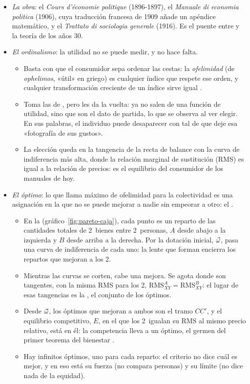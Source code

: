 \documentclass[11pt]{article}
\begin{document}
\begin{itemize}
\item \emph{La obra}: el \emph{Cours d'économie politique} (1896-1897)\nocite{Pareto1896Cours}, el \emph{Manuale di economia politica} (1906)\nocite{Pareto1906Manuale}, cuya traducción francesa de 1909 añade un apéndice matemático, y el \emph{Trattato di sociologia generale} (1916)\nocite{Pareto1916Trattato}. Es el puente entre  y la teoría de los años 30.
\item \emph{El ordinalismo}: la utilidad no se puede medir, y no hace falta.
  \begin{itemize}
  \item Basta con que el consumidor sepa ordenar las cestas: la \emph{ofelimidad} (de \emph{ophelimos}, «útil» en griego) es cualquier índice que respete ese orden, y cualquier transformación creciente de un índice sirve igual .
  \item Toma las  de , pero les da la vuelta: ya no salen de una función de utilidad, sino que son el dato de partida, lo que se observa al ver elegir. En sus palabras, el individuo puede desaparecer con tal de que deje esa «fotografía de sus gustos»\nocite{Pareto1906Manuale}.
  \item La elección queda en la tangencia de la recta de balance con la curva de indiferencia más alta, donde la relación marginal de sustitución (RMS) es igual a la relación de precios: es el equilibrio del consumidor de los manuales de hoy.
  \end{itemize}
\item \emph{El óptimo}: lo que  llama máximo de ofelimidad para la colectividad es una asignación en la que no se puede mejorar a nadie sin empeorar a otro: el .
  \begin{itemize}
  \item En la  (gráfico~\ref{fig:pareto-caja}), cada punto es un reparto de las cantidades totales de 2~bienes entre 2~personas, $A$ desde abajo a la izquierda y $B$ desde arriba a la derecha. Por la dotación inicial, $\vec{\omega}$, pasa una curva de indiferencia de cada uno: la lente que forman encierra los repartos que mejoran a los 2.
  \item Mientras las curvas se corten, cabe una mejora. Se agota donde son tangentes, con la misma RMS para los 2, $\mathrm{RMS}^A_{XY}=\mathrm{RMS}^B_{XY}$: el lugar de esas tangencias es la , el conjunto de los óptimos.
  \item Desde $\vec{\omega}$, los óptimos que mejoran a ambos son el tramo $CC'$, y el equilibrio competitivo, $E$, en el que los 2~igualan su RMS al mismo precio relativo, está en él: la competencia lleva a un óptimo, el germen del primer teorema del bienestar  .
  \item Hay infinitos óptimos, uno para cada reparto: el criterio no dice cuál es mejor, y en eso está su fuerza (no compara personas) y su límite (no dice nada de la equidad).
  \end{itemize}
\end{itemize}
\end{document}
